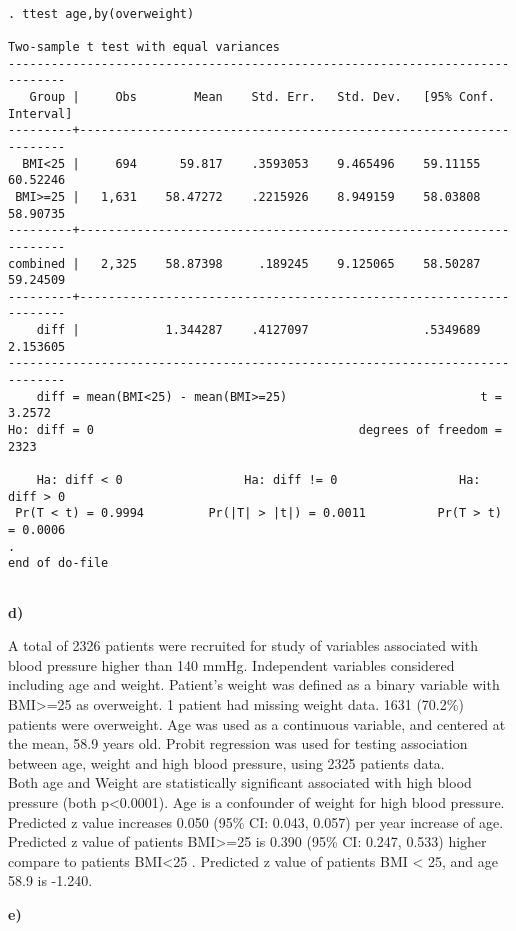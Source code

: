 \documentclass{article}
\begin{document}
\begin{verbatim}

. ttest age,by(overweight)

Two-sample t test with equal variances
------------------------------------------------------------------------------
   Group |     Obs        Mean    Std. Err.   Std. Dev.   [95% Conf. Interval]
---------+--------------------------------------------------------------------
  BMI<25 |     694      59.817    .3593053    9.465496    59.11155    60.52246
 BMI>=25 |   1,631    58.47272    .2215926    8.949159    58.03808    58.90735
---------+--------------------------------------------------------------------
combined |   2,325    58.87398     .189245    9.125065    58.50287    59.24509
---------+--------------------------------------------------------------------
    diff |            1.344287    .4127097                .5349689    2.153605
------------------------------------------------------------------------------
    diff = mean(BMI<25) - mean(BMI>=25)                           t =   3.2572
Ho: diff = 0                                     degrees of freedom =     2323

    Ha: diff < 0                 Ha: diff != 0                 Ha: diff > 0
 Pr(T < t) = 0.9994         Pr(|T| > |t|) = 0.0011          Pr(T > t) = 0.0006
. 
end of do-file


\end{verbatim}


\textbf{d)}

A total of 2326 patients were recruited for study of variables associated with blood pressure higher than 140 mmHg. Independent variables considered including age and weight. Patient's weight was defined as a binary variable with BMI>=25 as overweight. 1 patient had missing weight data. 1631 (70.2\%) patients were overweight. Age was used as a continuous variable, and centered at the mean, 58.9 years old. Probit regression was used for testing association between age, weight and high blood pressure, using 2325 patients data. \\
Both age and Weight are statistically significant associated with high blood pressure (both p<0.0001). Age is a confounder of weight for high blood pressure. Predicted z value increases 0.050 (95\% CI: 0.043, 0.057) per year increase of age. Predicted z value of patients BMI>=25 is 0.390 (95\% CI: 0.247, 0.533) higher compare to patients BMI<25 . Predicted z value of patients BMI < 25, and age 58.9 is -1.240.

\textbf{e)}
\end{document}

